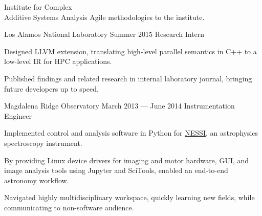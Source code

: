 \documentclass{tc_cv}
\newcommand{\jobSpace}{\vspace{0.75em}}
\begin{document}
\begin{minipage}[t]{0.6\linewidth}
\begin{job}{Institute for Complex \\ Additive Systems Analysis}
      Agile methodologies to the institute.
  \end{job}
  \jobSpace
  \begin{job}{Los Alamos National Laboratory}
    {Summer 2015}
    {Research Intern}
    \item Designed LLVM extension, translating high-level parallel
      semantics in C++ to a low-level IR for HPC applications.
    \item Published findings and related research in internal laboratory
      journal, bringing future developers up to speed.
  \end{job}
  \jobSpace
  \begin{job}{Magdalena Ridge Observatory}
    {March 2013 --- June 2014}
    {Instrumentation Engineer}
    \item Implemented control and analysis software in Python for
      \href{https://noirlab.edu/public/programs/kitt-peak-national-observatory/wiyn-35m-telescope/nessi/}{NESSI},
      an astrophysics spectroscopy instrument.
    \item By providing Linux device drivers for imaging and motor hardware,
      GUI, and image analysis tools using Jupyter and SciTools, enabled an
      end-to-end astronomy workflow.
    \item Navigated highly multidisciplinary workspace, quickly learning new
      fields, while communicating to non-software audience.
  \end{job}
\end{minipage}
\end{document}

